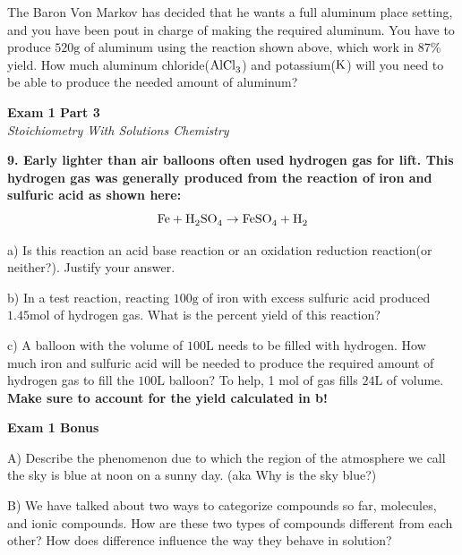 \documentclass{article}
\begin{document}
    The Baron Von Markov has decided that he wants a full aluminum place setting, and you have been pout in charge of making the required aluminum. You have to produce $520 \si{\gram}$ of aluminum using the reaction shown above, which work in $87\%$ yield. How much aluminum chloride($\ce{AlCl_{3}}$) and potassium($\ce{K}$) will you need to be able to produce the needed amount of aluminum?

    \pagebreak

    \begin{center}
        \textbf{Exam 1 Part 3}\\
        \textit{Stoichiometry With Solutions Chemistry}
    \end{center}
    \textbf{9. Early lighter than air balloons often used hydrogen gas for lift. This hydrogen gas was generally produced from the reaction of iron and sulfuric acid as shown here:}
    $$\ce{Fe} + \ce{H_{2}SO_{4}} \rightarrow \ce{FeSO_{4}} + \ce{H_{2}}$$

    a) Is this reaction an acid base reaction or an oxidation reduction reaction(or neither?). Justify your answer.

    b) In a test reaction, reacting $100 \si{\gram}$ of iron with excess sulfuric acid produced $1.45 \si{\mole}$ of hydrogen gas. What is the percent yield of this reaction?

    c) A balloon with the volume of $100 \si{\liter}$ needs to be filled with hydrogen. How much iron and sulfuric acid will be needed to produce the required amount of hydrogen gas to fill the $100 \si{\liter}$ balloon? To help, 1 $\si{\mole}$ of gas fills $24 \si{\liter}$ of volume. \textbf{Make sure to account for the yield calculated in b!}

    \pagebreak

    \begin{center}
        \textbf{Exam 1 Bonus}\\
    \end{center}

    A) Describe the phenomenon due to which the region of the atmosphere we call the sky is blue at noon on a sunny day. (aka Why is the sky blue?)

    B) We have talked about two ways to categorize compounds so far, molecules, and ionic compounds. How are these two types of compounds different from each other? How does difference influence the way they behave in solution?
\end{document}
